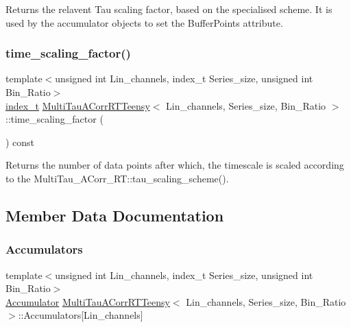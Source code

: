 Returns the relavent Tau scaling factor, based on the specialised scheme. It is used by the accumulator objects to set the Buffer\+Points attribute. 

\mbox{\label{classMultiTauACorrRTTeensy_a56fbc9bf757ac74e0dad862ec45def82}} 
\subsubsection{\texorpdfstring{time\+\_\+scaling\+\_\+factor()}{time\_scaling\_factor()}}
{\footnotesize\ttfamily template$<$unsigned int Lin\+\_\+channels, index\+\_\+t Series\+\_\+size, unsigned int Bin\+\_\+\+Ratio$>$ \\
\hyperlink{types_8hpp_a7c40bb931c31595ed6308605f4537447}{index\+\_\+t} \hyperlink{classMultiTauACorrRTTeensy}{Multi\+Tau\+A\+Corr\+R\+T\+Teensy}$<$ Lin\+\_\+channels, Series\+\_\+size, Bin\+\_\+\+Ratio $>$\+::time\+\_\+scaling\+\_\+factor (\begin{DoxyParamCaption}{ }\end{DoxyParamCaption}) const\hspace{0.3cm}{\ttfamily [inline]}}

Returns the number of data points after which, the timescale is scaled according to the Multi\+Tau\+\_\+\+A\+Corr\+\_\+\+R\+T\+::tau\+\_\+scaling\+\_\+scheme(). 

\subsection{Member Data Documentation}
\mbox{\label{classMultiTauACorrRTTeensy_aac3d87dfb6b995e83e20f444d3d5eb0d}} 
\subsubsection{\texorpdfstring{Accumulators}{Accumulators}}
{\footnotesize\ttfamily template$<$unsigned int Lin\+\_\+channels, index\+\_\+t Series\+\_\+size, unsigned int Bin\+\_\+\+Ratio$>$ \\
\hyperlink{classAccumulator}{Accumulator} \hyperlink{classMultiTauACorrRTTeensy}{Multi\+Tau\+A\+Corr\+R\+T\+Teensy}$<$ Lin\+\_\+channels, Series\+\_\+size, Bin\+\_\+\+Ratio $>$\+::Accumulators\mbox{[}Lin\+\_\+channels\mbox{]}\hspace{0.3cm}{\ttfamily [private]}}



